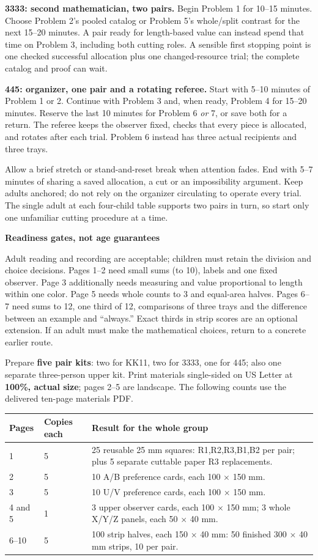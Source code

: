 \documentclass[11pt]{article}
\newcommand{\heading}[1]{\par\vspace{1.5mm}{\large\bfseries #1}\par\vspace{.8mm}}
\newcommand{\subhead}[1]{\par\vspace{1mm}\textbf{#1}\par}
\newcommand{\page}[1]{\newpage\heading{#1}}
\begin{document}
\textbf{3333: second mathematician, two pairs.} Begin Problem 1 for 10--15 minutes. Choose Problem 2's pooled catalog or Problem 5's whole/split contrast for the next 15--20 minutes. A pair ready for length-based value can instead spend that time on Problem 3, including both cutting roles. A sensible first stopping point is one checked successful allocation plus one changed-resource trial; the complete catalog and proof can wait.

\textbf{445: organizer, one pair and a rotating referee.} Start with 5--10 minutes of Problem 1 or 2. Continue with Problem 3 and, when ready, Problem 4 for 15--20 minutes. Reserve the last 10 minutes for Problem 6 \emph{or} 7, or save both for a return. The referee keeps the observer fixed, checks that every piece is allocated, and rotates after each trial. Problem 6 instead has three actual recipients and three trays.

Allow a brief stretch or stand-and-reset break when attention fades. End with 5--7 minutes of sharing a saved allocation, a cut or an impossibility argument. Keep adults anchored; do not rely on the organizer circulating to operate every trial. The single adult at each four-child table supports two pairs in turn, so start only one unfamiliar cutting procedure at a time.

\subhead{Readiness gates, not age guarantees}
Adult reading and recording are acceptable; children must retain the division and choice decisions. Pages 1--2 need small sums (to 10), labels and one fixed observer. Page 3 additionally needs measuring and value proportional to length within one color. Page 5 needs whole counts to 3 and equal-area halves. Pages 6--7 need sums to 12, one third of 12, comparisons of three trays and the difference between an example and ``always.'' Exact thirds in strip scores are an optional extension. If an adult must make the mathematical choices, return to a concrete earlier route.

\page{Print and assemble the actual kit}
Prepare \textbf{five pair kits}: two for KK11, two for 3333, one for 445; also one separate three-person upper kit. Print materials single-sided on US Letter at \textbf{100\%, actual size}; pages 2--5 are landscape. The following counts use the delivered ten-page materials PDF.

\begin{tabularx}{\linewidth}{@{}L{20mm}L{22mm}X@{}}\toprule
Pages & Copies each & Result for the whole group\\ & 5 & 25 reusable 25 mm squares: R1,R2,R3,B1,B2 per pair; plus 5 separate cuttable paper R3 replacements.\\
2 & 5 & 10 A/B preference cards, each 100 $\times$ 150 mm.\\
3 & 5 & 10 U/V preference cards, each 100 $\times$ 150 mm.\\
4 and 5 & 1 & 3 upper observer cards, each 100 $\times$ 150 mm; 3 whole X/Y/Z panels, each 50 $\times$ 40 mm.\\
6--10 & 5 & 100 strip halves, each 150 $\times$ 40 mm: 50 finished 300 $\times$ 40 mm strips, 10 per pair.\\\bottomrule
\end{tabularx}
\end{document}
